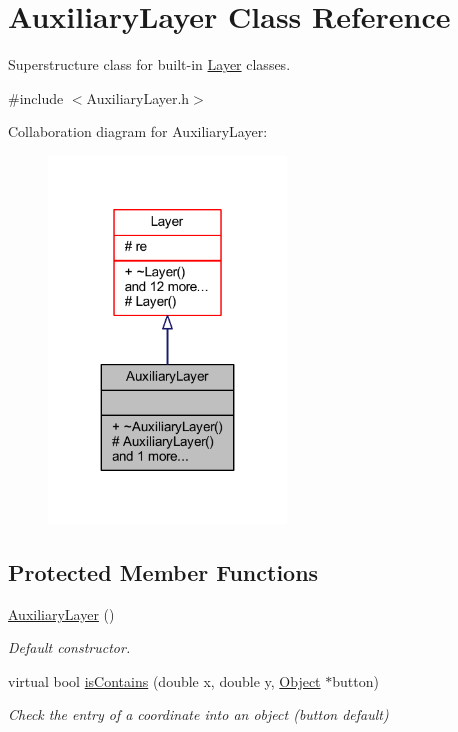 \hypertarget{class_auxiliary_layer}{}\section{Auxiliary\+Layer Class Reference}
\label{class_auxiliary_layer}


Superstructure class for built-\/in \hyperlink{class_layer}{Layer} classes.  




{\ttfamily \#include $<$Auxiliary\+Layer.\+h$>$}



Collaboration diagram for Auxiliary\+Layer\+:\nopagebreak
\begin{figure}[H]
\begin{center}
\leavevmode
\includegraphics[width=179pt]{class_auxiliary_layer__coll__graph}
\end{center}
\end{figure}
\subsection*{Protected Member Functions}
\begin{DoxyCompactItemize}
\item 
\mbox{\label{class_auxiliary_layer_a14a068a62e260548e70859a506a2fe7d}} 
\hyperlink{class_auxiliary_layer_a14a068a62e260548e70859a506a2fe7d}{Auxiliary\+Layer} ()
\begin{DoxyCompactList}\small\item\em Default constructor. \end{DoxyCompactList}\item 
virtual bool \hyperlink{class_auxiliary_layer_a2e8e6d2252aa08fc4e329b1301c52908}{is\+Contains} (double x, double y, \hyperlink{class_object}{Object} $\ast$button)
\begin{DoxyCompactList}\small\item\em Check the entry of a coordinate into an object (button default) \end{DoxyCompactList}\end{DoxyCompactItemize}
